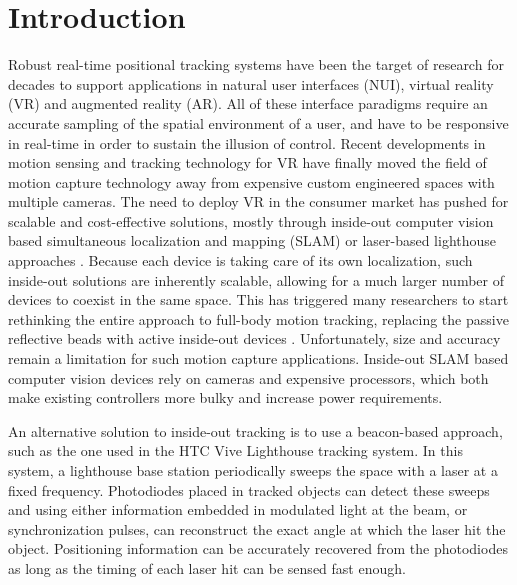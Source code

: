 \documentclass[sigchi]{acmart}
\begin{document}
\section{Introduction}
Robust real-time positional tracking systems have been the target of research for decades to support applications in natural user interfaces (NUI), virtual reality (VR) and augmented reality (AR). All of these interface paradigms require an accurate sampling of the spatial environment of a user, and have to be responsive in real-time in order to sustain the illusion of control. Recent developments in motion sensing and tracking technology for VR have finally moved the field of motion capture technology away from expensive custom engineered spaces with multiple cameras. The need to deploy VR in the consumer market has pushed for scalable and cost-effective solutions, mostly through inside-out computer vision based simultaneous localization and mapping (SLAM) \cite{Klein2007,Whelan2016} or laser-based lighthouse approaches \cite{Borges2018}.
\newline
Because each device is taking care of its own localization, such inside-out solutions are inherently scalable, allowing for a much larger number of devices to coexist in the same space. This has triggered many researchers to start rethinking the entire approach to full-body motion tracking, replacing the passive reflective beads with active inside-out devices \cite{Jiang2016}. Unfortunately, size and accuracy remain a limitation for such motion capture applications. Inside-out SLAM based computer vision devices rely on cameras and expensive processors, which both make existing controllers more bulky and increase power requirements.

An alternative solution to inside-out tracking is to use a beacon-based approach, such as the one used in the HTC Vive Lighthouse tracking system. In this system, a lighthouse base station periodically sweeps the space with a laser at a fixed frequency. Photodiodes placed in tracked objects can detect these sweeps and using either information embedded in modulated light at the beam, or synchronization pulses, can reconstruct the exact angle at which the laser hit the object. Positioning information can be accurately recovered from the photodiodes as long as the timing of each laser hit can be sensed fast enough.


\end{document}
